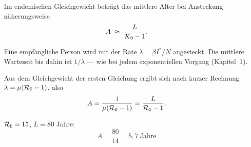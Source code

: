 \begin{merksatz}
Im endemischen Gleichgewicht beträgt das mittlere Alter bei Ansteckung näherungsweise
\[ A \;\approx\; \frac{L}{\mathcal{R}_0 - 1} . \]

Eine empfängliche Person wird mit der Rate $\lambda = \beta I^{*}/N$ angesteckt. Die mittlere Wartezeit bis dahin ist $1/\lambda$ --- wie bei jedem exponentiellen Vorgang (Kapitel~1).

Aus dem Gleichgewicht der ersten Gleichung ergibt sich nach kurzer Rechnung $\lambda = \mu(\mathcal{R}_0-1)$, also
\[ A = \frac{1}{\mu(\mathcal{R}_0-1)} = \frac{L}{\mathcal{R}_0-1} . \]

$\mathcal{R}_0 = 15$, $L = 80$ Jahre:
\[ A = \frac{80}{14} = 5{,}7 \ \text{Jahre} \]

\begin{center}
\begin{minipage}{0.88\textwidth}
\end{minipage}
\end{center}
\end{merksatz}

